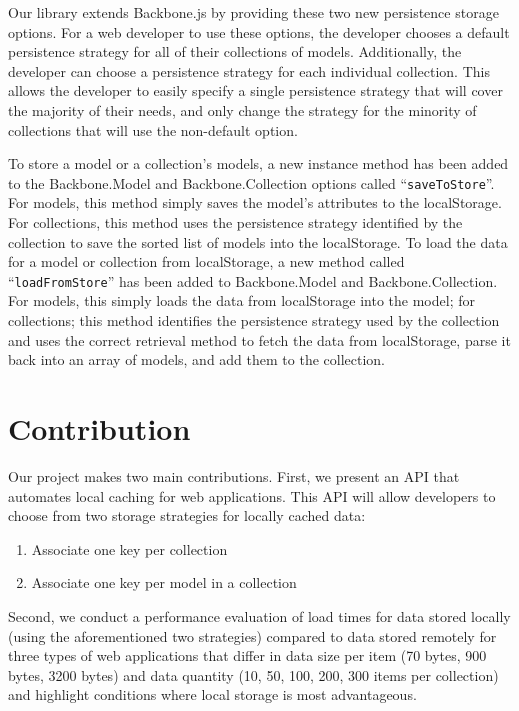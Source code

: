\documentclass[12pt]{article}
\begin{document}
Our library extends Backbone.js by providing these two new persistence storage
options. For a web developer to use these options, the developer chooses a
default persistence strategy for all of their collections of models.
Additionally, the developer can choose a persistence strategy for each
individual collection. This allows the developer to easily specify a single
persistence strategy that will cover the majority of their needs, and only
change the strategy for the minority of collections that will use the
non-default option.

To store a model or a collection's models, a new instance method has been added
to the Backbone.Model and Backbone.Collection options called
``\verb=saveToStore=''. For models, this method simply saves the model's
attributes to the localStorage. For collections, this method uses the
persistence strategy identified by the collection to save the sorted list of
models into the localStorage. To load the data for a model or collection from
localStorage, a new method called ``\verb=loadFromStore='' has been added to
Backbone.Model and Backbone.Collection. For models, this simply loads the data
from localStorage into the model; for collections; this method identifies the
persistence strategy used by the collection and uses the correct retrieval
method to fetch the data from localStorage, parse it back into an array of
models, and add them to the collection.

\section{Contribution}

Our project makes two main contributions. First, we present an API that
automates local caching for web applications. This API will allow developers to
choose from two storage strategies for locally cached data:

\begin{enumerate}
\item Associate one key per collection
\item Associate one key per model in a collection
\end{enumerate}

Second, we conduct a performance evaluation of load times for data
stored locally (using the aforementioned two strategies) compared to data
stored remotely for three types of web applications that differ in data size
per item (70 bytes, 900 bytes, 3200 bytes) and data quantity (10, 50, 100, 200,
300 items per collection) and highlight conditions where local storage is most
advantageous.
\end{document}
